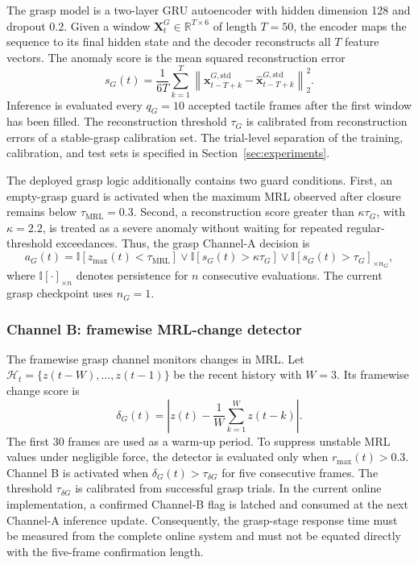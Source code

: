 The grasp model is a two-layer GRU autoencoder with hidden dimension 128 and
dropout 0.2. Given a window
$\mathbf{X}^{G}_t\in\mathbb{R}^{T\times6}$ of length $T=50$, the encoder maps
the sequence to its final hidden state and the decoder reconstructs all
$T$ feature vectors. The anomaly score is the mean squared reconstruction
error
%
\begin{equation}
    s_G(t)
    =
    \frac{1}{6T}
    \sum_{k=1}^{T}
    \left\|
    \mathbf{x}^{G,\mathrm{std}}_{t-T+k}
    -
    \hat{\mathbf{x}}^{G,\mathrm{std}}_{t-T+k}
    \right\|_2^2 .
    \label{eq:grasp_score}
\end{equation}
%
Inference is evaluated every $q_G=10$ accepted tactile frames after the first
window has been filled. The reconstruction threshold $\tau_G$ is calibrated
from reconstruction errors of a stable-grasp calibration set. The trial-level
separation of the training, calibration, and test sets is specified in
Section~\ref{sec:experiments}.

The deployed grasp logic additionally contains two guard conditions. First, an
empty-grasp guard is activated when the maximum MRL observed after closure
remains below $\tau_{\mathrm{MRL}}=0.3$. Second, a reconstruction score greater
than $\kappa\tau_G$, with $\kappa=2.2$, is treated as a severe anomaly without
waiting for repeated regular-threshold exceedances. Thus, the grasp Channel-A
decision is
%
\begin{equation}
    a_G(t)
    =
    \mathbb{I}\!\left[z_{\max}(t)<\tau_{\mathrm{MRL}}\right]
    \lor
    \mathbb{I}\!\left[s_G(t)>\kappa\tau_G\right]
    \lor
    \mathbb{I}\!\left[s_G(t)>\tau_G\right]_{\times n_G},
    \label{eq:grasp_channel_a}
\end{equation}
%
where $\mathbb{I}[\cdot]_{\times n}$ denotes persistence for $n$ consecutive
evaluations. The current grasp checkpoint uses $n_G=1$.

\subsubsection{Channel B: framewise MRL-change detector}

The framewise grasp channel monitors changes in MRL. Let
$\mathcal{H}_t=\{z(t-W),\ldots,z(t-1)\}$ be the recent history with $W=3$.
Its framewise change score is
%
\begin{equation}
    \delta_G(t)
    =
    \left|
    z(t)-\frac{1}{W}\sum_{k=1}^{W}z(t-k)
    \right|.
    \label{eq:grasp_delta}
\end{equation}
%
The first 30 frames are used as a warm-up period. To suppress unstable MRL
values under negligible force, the detector is evaluated only when
$r_{\max}(t)>0.3$. Channel B is activated when
$\delta_G(t)>\tau_{\delta G}$ for five consecutive frames. The threshold
$\tau_{\delta G}$ is calibrated from successful grasp trials.
In the current online implementation, a confirmed Channel-B flag is latched
and consumed at the next Channel-A inference update. Consequently, the
grasp-stage response time must be measured from the complete online system and
must not be equated directly with the five-frame confirmation length.

